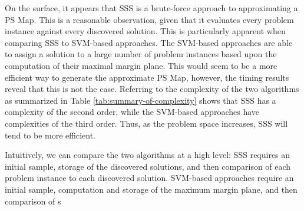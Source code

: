 On the surface, it appears that SSS is a brute-force approach to approximating a PS Map.  This is a reasonable observation, given that it evaluates every problem instance against every discovered solution.  This is particularly apparent when comparing SSS to SVM-based approaches.  The SVM-based approaches are able to assign a solution to a large number of problem instances based upon the computation of their maximal margin plane.  This would seem to be a more efficient way to generate the approximate PS Map, however, the timing results reveal that this is not the case.  Referring to  the complexity of the two algorithms as summarized in Table \ref{tab:summary-of-complexity} shows that SSS has a complexity of the second order, while the SVM-based approaches have complexities of the third order.  Thus, as the problem space increases, SSS will tend to be more efficient.  

Intuitively, we can compare the two algorithms at a high level:  SSS requires an initial sample, storage of the discovered solutions, and then comparison of each problem instance to each discovered solution.  SVM-based approaches require an initial sample, computation and storage of the maximum margin plane, and then comparison of s
